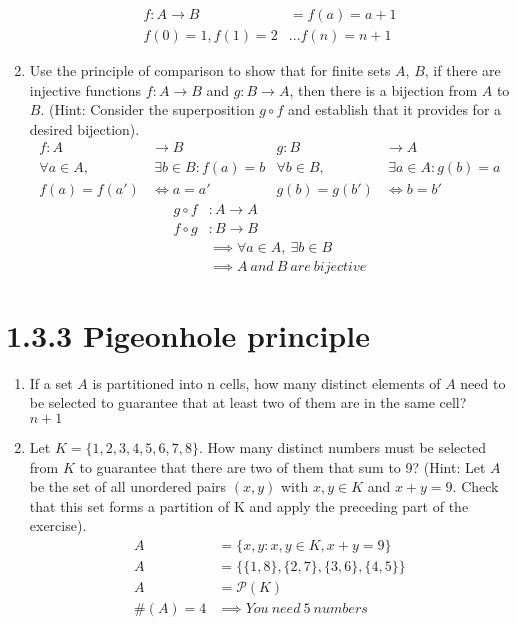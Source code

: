 \documentclass{article}
\begin{document}
\begin{enumerate}
\begin{align*}
        f: A \rightarrow B &= f(a) = a + 1\\
        f(0) = 1, f(1) = 2 &... f(n) = n + 1
    \end{align*}
    \item Use the principle of comparison to show that for finite sets $A$, $B$, if there are injective functions $f : A \rightarrow B$ and $g: B \rightarrow A$, then there is a bijection from $A$ to $B$. (Hint: Consider the superposition $g \circ f$ and establish that it provides for a desired bijection).
    \begin{align*}
        f: A &\rightarrow B & g: B &\rightarrow A\\
        \forall a \in A,&\ \exists b \in B: f(a) = b & \forall b \in B,&\ \exists a \in A: g(b) = a\\
        f(a) = f(a') &\iff a = a' & g(b) = g(b') &\iff b = b'
    \end{align*}
    \begin{align*}
        g \circ f &: A \rightarrow A\\
        f \circ g &: B \rightarrow B\\
        &\implies \forall a \in A,\ \exists b \in B\\
        &\implies A\ and\ B\ are\ bijective
    \end{align*}
\end{enumerate}
\newpage

\section*{1.3.3 Pigeonhole principle}
\begin{enumerate}
    \item If a set $A$ is partitioned into n cells, how many distinct elements of $A$ need to be selected to guarantee that at least two of them are in the same cell?\\
    $n + 1$
    \item Let $K =\{1,2,3,4,5,6,7,8\}$. How many distinct numbers must be selected from $K$ to guarantee that there are two of them that sum to 9? (Hint: Let $A$ be the set of all unordered pairs $(x,y)$ with $x,y \in K$ and $x+y = 9$. Check that this set forms a partition of K and apply the preceding part of the exercise).
    \begin{align*}
        A &= \{{x, y}: x, y \in K, x + y = 9 \}\\
        A &= \{\{1, 8\}, \{2, 7\}, \{3, 6\}, \{4, 5\}\}\\
        A &= \mathcal{P}(K)\\
        \#(A) = 4 &\implies You\ need\ 5\ numbers
    \end{align*}
\end{enumerate}
\end{document}
